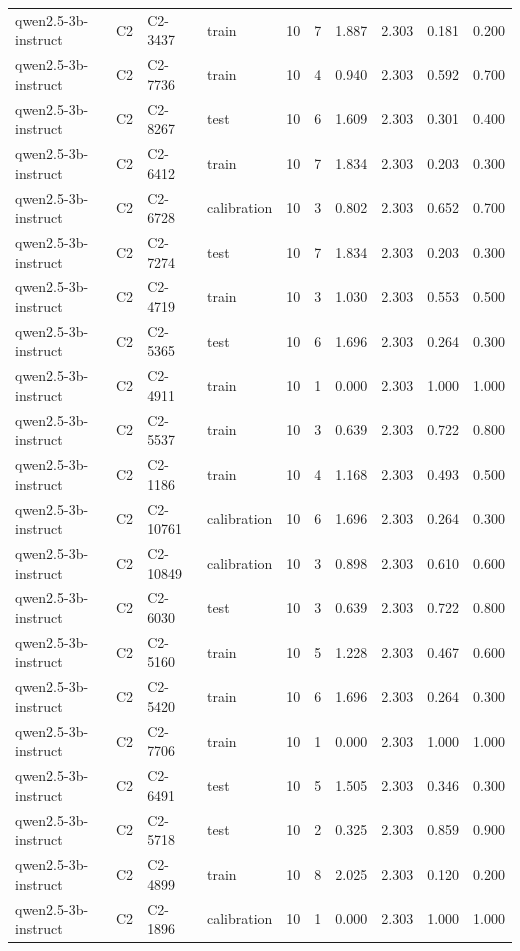 \begin{table}
\begin{tabular}{llllrrrrrr}
qwen2.5-3b-instruct & C2 & C2-3437 & train & 10 & 7 & 1.887 & 2.303 & 0.181 & 0.200 \\
qwen2.5-3b-instruct & C2 & C2-7736 & train & 10 & 4 & 0.940 & 2.303 & 0.592 & 0.700 \\
qwen2.5-3b-instruct & C2 & C2-8267 & test & 10 & 6 & 1.609 & 2.303 & 0.301 & 0.400 \\
qwen2.5-3b-instruct & C2 & C2-6412 & train & 10 & 7 & 1.834 & 2.303 & 0.203 & 0.300 \\
qwen2.5-3b-instruct & C2 & C2-6728 & calibration & 10 & 3 & 0.802 & 2.303 & 0.652 & 0.700 \\
qwen2.5-3b-instruct & C2 & C2-7274 & test & 10 & 7 & 1.834 & 2.303 & 0.203 & 0.300 \\
qwen2.5-3b-instruct & C2 & C2-4719 & train & 10 & 3 & 1.030 & 2.303 & 0.553 & 0.500 \\
qwen2.5-3b-instruct & C2 & C2-5365 & test & 10 & 6 & 1.696 & 2.303 & 0.264 & 0.300 \\
qwen2.5-3b-instruct & C2 & C2-4911 & train & 10 & 1 & 0.000 & 2.303 & 1.000 & 1.000 \\
qwen2.5-3b-instruct & C2 & C2-5537 & train & 10 & 3 & 0.639 & 2.303 & 0.722 & 0.800 \\
qwen2.5-3b-instruct & C2 & C2-1186 & train & 10 & 4 & 1.168 & 2.303 & 0.493 & 0.500 \\
qwen2.5-3b-instruct & C2 & C2-10761 & calibration & 10 & 6 & 1.696 & 2.303 & 0.264 & 0.300 \\
qwen2.5-3b-instruct & C2 & C2-10849 & calibration & 10 & 3 & 0.898 & 2.303 & 0.610 & 0.600 \\
qwen2.5-3b-instruct & C2 & C2-6030 & test & 10 & 3 & 0.639 & 2.303 & 0.722 & 0.800 \\
qwen2.5-3b-instruct & C2 & C2-5160 & train & 10 & 5 & 1.228 & 2.303 & 0.467 & 0.600 \\
qwen2.5-3b-instruct & C2 & C2-5420 & train & 10 & 6 & 1.696 & 2.303 & 0.264 & 0.300 \\
qwen2.5-3b-instruct & C2 & C2-7706 & train & 10 & 1 & 0.000 & 2.303 & 1.000 & 1.000 \\
qwen2.5-3b-instruct & C2 & C2-6491 & test & 10 & 5 & 1.505 & 2.303 & 0.346 & 0.300 \\
qwen2.5-3b-instruct & C2 & C2-5718 & test & 10 & 2 & 0.325 & 2.303 & 0.859 & 0.900 \\
qwen2.5-3b-instruct & C2 & C2-4899 & train & 10 & 8 & 2.025 & 2.303 & 0.120 & 0.200 \\
qwen2.5-3b-instruct & C2 & C2-1896 & calibration & 10 & 1 & 0.000 & 2.303 & 1.000 & 1.000 \\

\end{tabular}
\end{table}
